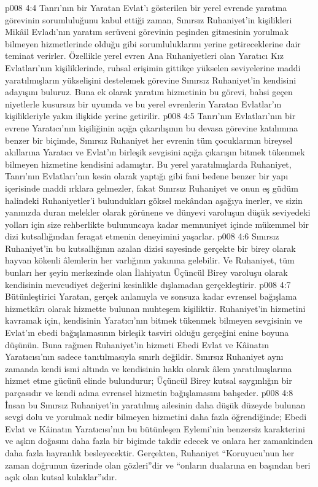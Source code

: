 \vs p008 4:4 Tanrı’nın bir Yaratan Evlat’ı gösterilen bir yerel evrende yaratma görevinin sorumluluğunu kabul ettiği zaman, Sınırsız Ruhaniyet’in kişilikleri Mikâil Evladı’nın yaratım serüveni görevinin peşinden gitmesinin yorulmak bilmeyen hizmetlerinde olduğu gibi sorumluluklarını yerine getireceklerine dair teminat verirler. Özellikle yerel evren Ana Ruhaniyetleri olan Yaratıcı Kız Evlatları’nın kişiliklerinde, ruhsal erişimin gittikçe yükselen seviyelerine maddi yaratılmışların yükselişini destelemek görevine Sınırsız Ruhaniyet’in kendisini adayışını buluruz. Buna ek olarak yaratım hizmetinin bu görevi, bahsi geçen niyetlerle kusursuz bir uyumda ve bu yerel evrenlerin Yaratan Evlatlar’ın kişilikleriyle yakın ilişkide yerine getirilir.
\vs p008 4:5 Tanrı'nın Evlatları’nın bir evrene Yaratıcı’nın kişiliğinin açığa çıkarılışının bu devasa görevine katılımına benzer bir biçimde, Sınırsız Ruhaniyet her evrenin tüm çocuklarının bireysel akıllarına Yaratıcı ve Evlat’ın birleşik sevgisini açığa çıkarışın bitmek tükenmek bilmeyen hizmetine kendisini adamıştır. Bu yerel yaratılmışlarda Ruhaniyet, Tanrı'nın Evlatları’nın kesin olarak yaptığı gibi fani bedene benzer bir yapı içerisinde maddi ırklara gelmezler, fakat Sınırsız Ruhaniyet ve onun eş güdüm halindeki Ruhaniyetler’i bulundukları göksel mekândan aşağıya inerler, ve sizin yanınızda duran melekler olarak görünene ve dünyevi varoluşun düşük seviyedeki yolları için size rehberlikte bulununcaya kadar memnuniyet içinde mükemmel bir dizi kutsallığından feragat etmenin deneyimini yaşarlar.
\vs p008 4:6 Sınırsız Ruhaniyet’in bu kutsallığının azalan dizisi sayesinde gerçekte bir birey olarak hayvan kökenli âlemlerin her varlığının yakınına gelebilir. Ve Ruhaniyet, tüm bunları her şeyin merkezinde olan İlahiyatın Üçüncül Birey varoluşu olarak kendisinin mevcudiyet değerini kesinlikle dışlamadan gerçekleştirir.
\vs p008 4:7 Bütünleştirici Yaratan, gerçek anlamıyla ve sonsuza kadar evrensel bağışlama hizmetkârı olarak hizmette bulunan muhteşem kişiliktir. Ruhaniyet’in hizmetini kavramak için, kendisinin Yaratıcı’nın bitmek tükenmek bilmeyen sevgisinin ve Evlat’ın ebedi bağışlamasının birleşik tasviri olduğu gerçeğini enine boyuna düşünün. Buna rağmen Ruhaniyet’in hizmeti Ebedi Evlat ve Kâinatın Yaratıcısı’nın sadece tanıtılmasıyla sınırlı değildir. Sınırsız Ruhaniyet aynı zamanda kendi ismi altında ve kendisinin hakkı olarak âlem yaratılmışlarına hizmet etme gücünü elinde bulundurur; Üçüncül Birey kutsal saygınlığın bir parçasıdır ve kendi adına evrensel hizmetin bağışlamasını bahşeder.
\vs p008 4:8 İnsan bu Sınırsız Ruhaniyet’in yaratılmış ailesinin daha düşük düzeyde bulunan sevgi dolu ve yorulmak nedir bilmeyen hizmetini daha fazla öğrendiğinde; Ebedi Evlat ve Kâinatın Yaratıcısı’nın bu bütünleşen Eylemi’nin benzersiz karakterini ve aşkın doğasını daha fazla bir biçimde takdir edecek ve onlara her zamankinden daha fazla hayranlık besleyecektir. Gerçekten, Ruhaniyet “Koruyucu’nun her zaman doğrunun üzerinde olan gözleri”dir ve “onların dualarına en başından beri açık olan kutsal kulaklar”ıdır.

